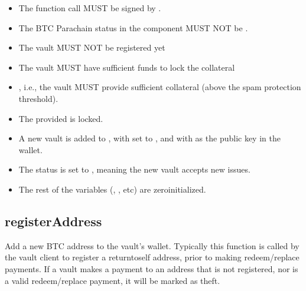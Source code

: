 \documentclass[a4paper,10pt,english]{sphinxmanual}
\begin{document}
\begin{itemize}
\item {} 
The function call MUST be signed by .

\item {} 
The BTC Parachain status in the {\hyperref[\detokenize{spec/security:security}]{}} component MUST NOT be .

\item {} 
The vault MUST NOT be registered yet

\item {} 
The vault MUST have sufficient funds to lock the collateral

\item {} 
, i.e., the vault MUST provide sufficient collateral (above the spam protection threshold).

\end{itemize}

\begin{itemize}
\item {} 
The provided  is locked.

\item {} 
A new vault is added to , with  set to , and with  as the public key in the wallet.

\item {} 
The status is set to , meaning the new vault accepts new issues.

\item {} 
The rest of the variables (, , etc) are zero\sphinxhyphen{}initialized.

\end{itemize}


\subsection{registerAddress}
\label{\detokenize{spec/vault-registry:registeraddress}}\label{\detokenize{spec/vault-registry:id5}}
Add a new BTC address to the vault’s wallet. Typically this function is called by the vault client to register a return\sphinxhyphen{}to\sphinxhyphen{}self address, prior to making redeem/replace payments. If a vault makes a payment to an address that is not registered, nor is a valid redeem/replace payment, it will be marked as theft.
\end{document}

